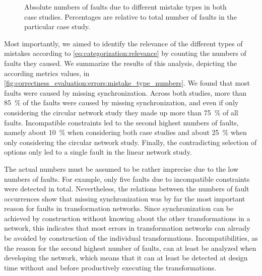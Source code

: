 \begin{figure}
    \centering
    
    \caption[Number of occurrences of mistake types]{Absolute numbers of faults due to different mistake types in both case studies. Percentages are relative to total number of faults in the particular case study.}
    \label{fig:correctness_evaluation:errors:mistake_type_numbers}
\end{figure}

Most importantly, we aimed to identify the relevance of the different types of mistakes according to \autoref{eq:categorization:relevance} by counting the numbers of faults they caused.
We summarize the results of this analysis, depicting the according metrics values, in \autoref{fig:correctness_evaluation:errors:mistake_type_numbers}.
We found that most faults were caused by missing synchronization.
Across both studies, more than \SI{85}{\percent} of the faults were caused by missing synchronization, and even if only considering the circular network study they made up more than \SI{75}{\percent} of all faults.
Incompatible constraints led to the second highest numbers of faults, namely about \SI{10}{\percent} when considering both case studies and about \SI{25}{\percent} when only considering the circular network study.
Finally, the contradicting selection of options only led to a single fault in the linear network study.

The actual numbers must be assumed to be rather imprecise due to the low numbers of faults.
For example, only five faults due to incompatible constraints were detected in total.
Nevertheless, the relations between the numbers of fault occurrences show that missing synchronization was by far the most important reason for faults in transformation networks.
Since synchronization can be achieved by construction without knowing about the other transformations in a network, this indicates that most errors in transformation networks can already be avoided by construction of the individual transformations.
Incompatibilities, as the reason for the second highest number of faults, can at least be analyzed when developing the network, which means that it can at least be detected at design time without and before productively executing the transformations.


